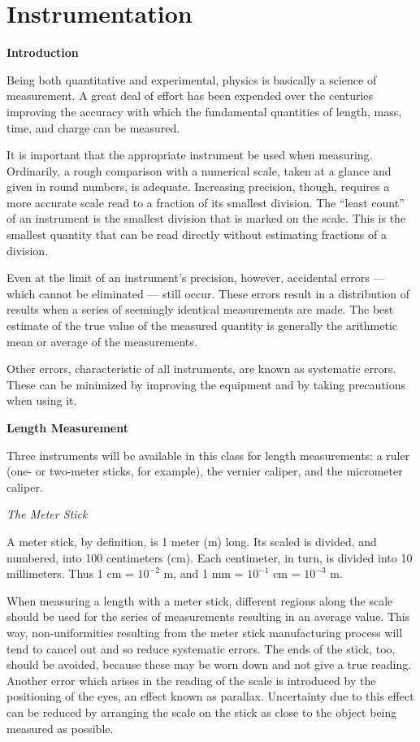 
\section{Instrumentation}

\textbf{Introduction}

Being both quantitative and experimental, physics is basically a science of measurement. A great deal of effort has been expended over the centuries improving the accuracy with which the fundamental quantities of length, mass, time, and charge can be measured.

It is important that the appropriate instrument be used when measuring. Ordinarily, a rough comparison with a numerical scale, taken at a glance and given in round numbers, is adequate. Increasing precision, though, requires a more accurate scale read to a fraction of its smallest division. The ``least count'' of an instrument is the smallest division that is marked on the scale. This is the smallest quantity that can be read directly without estimating fractions of a division.

Even at the limit of an instrument's precision, however, accidental
errors --- which cannot be eliminated --- still occur. These errors
result in a distribution of results when a series of seemingly
identical measurements are made.  The best estimate of the
true value of the measured quantity is generally
the arithmetic mean or average of the measurements.

Other errors, characteristic of all instruments, are known as systematic errors. These can be minimized by improving the equipment and by taking precautions when using it.

\textbf{Length Measurement}

Three instruments will be available in this class for length measurements: \hspace{3pt} a ruler (one- or two-meter sticks, for example), the vernier caliper, and the micrometer caliper.

\textit{The Meter Stick}

A meter stick, by definition, is 1 meter (m) long. Its scaled is divided, and numbered, into 100 centimeters (cm). Each centimeter, in turn, is divided into 10 millimeters. Thus 1 cm = $10^{-2}$ m, and 1 mm = $10^{-1}$ cm = $10^{-3}$ m.

When measuring a length with a meter stick, different regions along the scale should be used for the series of measurements resulting in an average value. This way, non-uniformities resulting from the meter stick manufacturing process will tend to cancel out and so reduce systematic errors. The ends of the stick, too, should be avoided, because these may be worn down and not give a true reading. Another error which arises in the reading of the scale is introduced by the positioning of the eyes, an effect known as parallax. Uncertainty due to this effect can be reduced by arranging the scale on the stick as close to the object being measured as possible.

